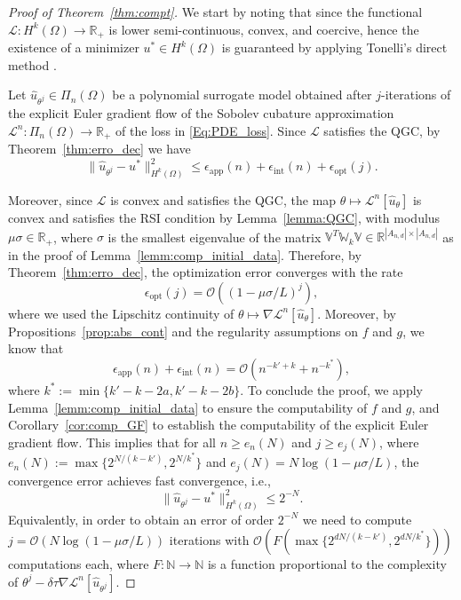 \documentclass[pdflatex]{sn-jnl}%
\begin{document}
\vspace{-1em}\begin{proof}[Proof of Theorem~\ref{thm:compt}]
    We start by noting that since the functional $\mathcal{L}:H^{k}(\Omega)\rightarrow \mathbb{R}_+$ is lower semi-continuous, convex, and coercive, hence the existence of a minimizer $u^*\in H^{k}(\Omega)$ is guaranteed by applying Tonelli's direct method \cite{Maso1993}. 

    Let $\hat{u}_{\theta^j}\in\Pi_{n}(\Omega)$ be a polynomial surrogate model obtained after $j$-iterations of the explicit Euler gradient flow of the Sobolev cubature approximation $\mathcal{L}^n:\Pi_n(\Omega)\rightarrow\mathbb{R}_+$ of the loss in \eqref{Eq:PDE_loss}. Since $\mathcal{L}$ satisfies the QGC, by Theorem~\ref{thm:erro_dec} we have 
    \begin{equation}\label{eq:err_dec}
        \|\hat{u}_{\theta^j}-u^*\|_{H^k(\Omega)}^2\leq \epsilon_{\mathrm{app}}(n) + \epsilon_{\mathrm{int}}(n)+\epsilon_{\mathrm{opt}}(j).
    \end{equation}

    Moreover, since $\mathcal{L}$ is convex and satisfies the QGC, the map $\theta\mapsto \mathcal{L}^n[\hat{u}_\theta]$ is convex and satisfies the RSI condition by Lemma~\ref{lemma:QGC}, with modulus $\mu\sigma \in\mathbb{R}_+$, where $\sigma$ is the smallest eigenvalue of the matrix $\mathbb{V}^T\mathbb{W}_k\mathbb{V}\in \mathbb{R}^{|A_{n,d}|\times|A_{n,d}|}$ as in the proof of Lemma~\ref{lemm:comp_initial_data}. Therefore, by Theorem~\ref{thm:erro_dec}, the optimization error converges with the rate
    \begin{equation}
        \epsilon_{\mathrm{opt}}(j) = \mathcal{O}\left((1-\mu\sigma/L)^{j}\right),
    \end{equation}
where we used the Lipschitz continuity of $\theta \mapsto \nabla\mathcal{L}^n[\hat{u}_\theta]$.
Moreover, by Propositions~\ref{prop:abs_cont} and the regularity assumptions on $f$ and $g$, we know that 
$$
\epsilon_{\mathrm{app}}(n) + \epsilon_{\mathrm{int}}(n) = \mathcal{O}(n^{-k'+k}+n^{-k^*}),
$$
where $k^*:= \min\{k'-k-2a, k'-k-2b\}$.
To conclude the proof, we apply Lemma~\ref{lemm:comp_initial_data} to ensure the computability of $f$ and $g$, and Corollary~\ref{cor:comp_GF} to establish the computability of the explicit Euler gradient flow. This implies that for all $n\geq e_n(N)$ and $j\geq e_j(N)$, where $e_n(N):=\max\{2^{N/(k-k')},2^{N/k^*}\}$ and $e_j(N) =N\log(1-\mu\sigma/L) $, the convergence error achieves fast convergence, i.e.,
\begin{equation}
    \|\hat{u}_{\theta^j}-u^*\|_{H^k(\Omega)}^2\leq 2^{-N}.
\end{equation}
Equivalently, in order to obtain an error of order $2^{-N}$ we need to compute $j=\mathcal{O}(N\log(1-\mu\sigma/L))$ iterations with $\mathcal{O}(F(\max\{2^{dN/(k-k')},2^{dN/k^*}\}))$ computations each, where $F:\mathbb{N}\rightarrow\mathbb{N}$ is a function proportional to the complexity of $\theta^j-\delta\tau\nabla\mathcal{L}^n[\hat{u}_{\theta^j}]$. 
\end{proof}
\end{document}
